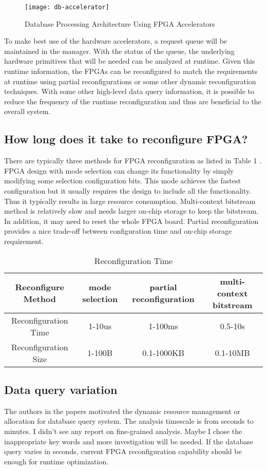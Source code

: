 \documentclass[12pt]{article} %
\begin{document}
\begin{figure}[H]
\centering
\texttt{[image: db-accelerator]}
\caption{Database Processing Architecture Using FPGA Accelerators}
\label{fig:db-accelerator}
\end{figure}


To make best use of the hardware accelerators, a request queue will be maintained in the manager.
With the status of the queue, the underlying hardware primitives that will be needed can be analyzed
at runtime. Given this runtime information, the FPGAs can be reconfigured to match the requirements
at runtime using partial reconfigurations or some other dynamic reconfiguration techniques.
With some other high-level data query information, it is possible to reduce the frequency of the
runtime reconfiguration and thus are beneficial to the overall system. 

\subsection{How long does it take to reconfigure FPGA?}
There are typically three methods for FPGA reconfiguration as listed in Table 1 \cite{papadimitriou2011performance}. FPGA design with mode selection can
change its functionality by simply modifying some selection configuration bits. This mode achieves
the fastest configuration but it usually requires the design to include all the functionality. Thus
it typically results in large resource consumption. Multi-context bitstream method is relatively slow and
needs larger on-chip storage to keep the bitstream. In addition, it may need to reset the whole FPGA
board. Partial reconfiguration provides a nice trade-off between configuration time and on-chip
storage requirement. 
\begin{table}[!hbp]
    \centering
    \small
\begin{tabular}{c|c|c|c}
\hline
Reconfigure Method & mode selection & partial reconfiguration & multi-context bitstream \\
\hline
Reconfiguration Time & 1-10us & 1-100ms & 0.5-10s \\
\hline
Reconfiguration Size & 1-100B & 0.1-1000KB & 0.1-10MB \\
\hline
\end{tabular}
\caption{Reconfiguration Time}
\end{table} 


\subsection{Data query variation}
The authors in the papers \cite{guotowards}
\cite{soundararajan2009dynamic} motivated the dynamic resource management or allocation for database query
system. The analysis timescale is from seconds to minutes. I didn't see any report on
fine-grained analysis. Maybe I chose the inappropriate key words and more investigation will be
needed. If the database query varies in seconds, current FPGA reconfiguration capability should be
enough for runtime optimization.  
\end{document}
